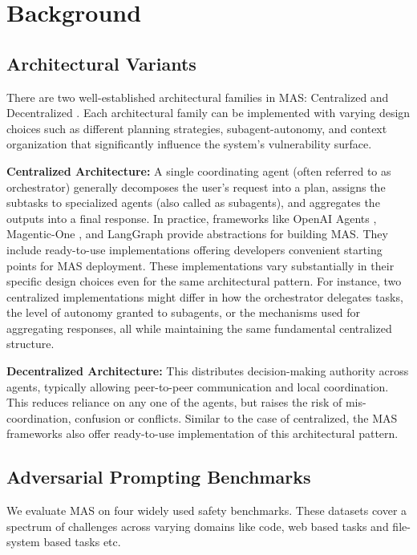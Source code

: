 \section{Background}

\subsection{Architectural Variants}

There are two well-established architectural families in MAS: Centralized and Decentralized \citep{yang2025agentnetdecentralizedevolutionarycoordination}. Each architectural family can be implemented with varying design choices such as different planning strategies, subagent-autonomy, and context organization that significantly influence the system's vulnerability surface.

\textbf{Centralized Architecture:} A single coordinating agent (often referred to as orchestrator) generally decomposes the user’s request into a plan, assigns the subtasks to specialized agents (also called as subagents), and aggregates the outputs into a final response. In practice, frameworks like OpenAI Agents \citep{OpenAIAgentsSDK2025}, Magentic-One \citep{fourney2024magenticonegeneralistmultiagentsolving}, and LangGraph \citep{LangGraph} provide abstractions for building MAS. They include ready-to-use implementations offering developers convenient starting points for MAS deployment. These implementations vary substantially in their specific design choices even for the same architectural pattern. For instance, two centralized implementations might differ in how the orchestrator delegates tasks, the level of autonomy granted to subagents, or the mechanisms used for aggregating responses, all while maintaining the same fundamental centralized structure. 

\textbf{Decentralized Architecture:} This distributes decision-making authority across agents, typically allowing peer-to-peer communication and local coordination. This reduces reliance on any one of the agents, but raises the risk of mis-coordination, confusion or conflicts. Similar to the case of centralized, the MAS frameworks also offer ready-to-use implementation of this architectural pattern. 

\vspace{-5pt}
\subsection{Adversarial Prompting Benchmarks}
We evaluate MAS on four widely used safety benchmarks. These datasets cover a spectrum of challenges across varying domains like code, web based tasks and file-system based tasks etc. 

